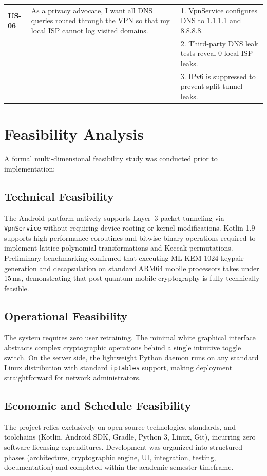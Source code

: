 \begin{table}[htbp]
\begin{tabular}{@{}P{1.8cm}P{5.0cm}P{7.2cm}@{}}
    \addlinespace
    \textbf{US-06} & As a privacy advocate, I want all DNS queries routed through the VPN so that my local ISP cannot log visited domains. & 1. VpnService configures DNS to 1.1.1.1 and 8.8.8.8.\\ & & 2. Third-party DNS leak tests reveal 0 local ISP leaks.\\ & & 3. IPv6 is suppressed to prevent split-tunnel leaks. \\
    \bottomrule
  \end{tabular}
\end{table}

\section{Feasibility Analysis}
\label{sec:feasibility_analysis}

A formal multi-dimensional feasibility study was conducted prior to implementation:

\subsection{Technical Feasibility}
The Android platform natively supports Layer~3 packet tunneling via \texttt{VpnService} without requiring device rooting or kernel modifications. Kotlin 1.9 supports high-performance coroutines and bitwise binary operations required to implement lattice polynomial transformations and Keccak permutations. Preliminary benchmarking confirmed that executing ML-KEM-1024 keypair generation and decapsulation on standard ARM64 mobile processors takes under 15\,ms, demonstrating that post-quantum mobile cryptography is fully technically feasible.

\subsection{Operational Feasibility}
The system requires zero user retraining. The minimal white graphical interface abstracts complex cryptographic operations behind a single intuitive toggle switch. On the server side, the lightweight Python daemon runs on any standard Linux distribution with standard \texttt{iptables} support, making deployment straightforward for network administrators.

\subsection{Economic and Schedule Feasibility}
The project relies exclusively on open-source technologies, standards, and toolchains (Kotlin, Android SDK, Gradle, Python 3, Linux, Git), incurring zero software licensing expenditures. Development was organized into structured phases (architecture, cryptographic engine, UI, integration, testing, documentation) and completed within the academic semester timeframe.

